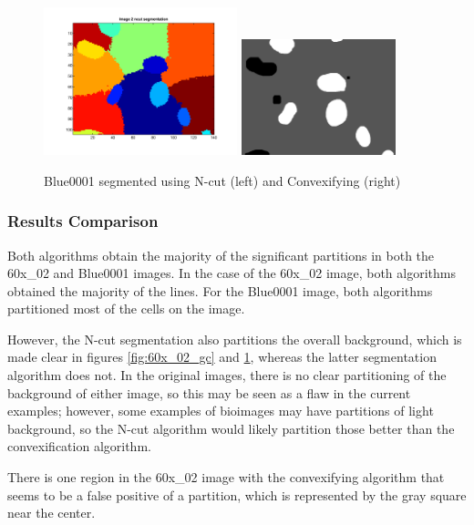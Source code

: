 \documentclass{article}
\begin{document}
\begin{figure}
\centering
\includegraphics[width=0.5\textwidth]{figures/Blue0001_gc1.pdf}
\includegraphics[width=0.4\textwidth]{figures/Blue0001_gc2.png}
\caption{Blue0001 segmented using N-cut (left) and Convexifying (right)}
\label{fig:blue_gc}
\end{figure}


\subsubsection*{Results Comparison}

Both algorithms obtain the majority of the significant partitions in both the 60x\_02 and Blue0001 images. In the case of the 60x\_02 image, both algorithms obtained the majority of the lines. For the Blue0001 image, both algorithms partitioned most of the cells on the image.

However, the N-cut segmentation also partitions the overall background, which is made clear in figures \ref{fig:60x_02_gc} and \ref{fig:blue_gc}, whereas the latter segmentation algorithm does not. In the original images, there is no clear partitioning of the background of either image, so this may be seen as a flaw in the current examples; however, some examples of bioimages may have partitions of light background, so the N-cut algorithm would likely partition those better than the convexification algorithm.

There is one region in the 60x\_02 image with the convexifying algorithm that seems to be a false positive of a partition, which is represented by the gray square near the center.
\end{document}
